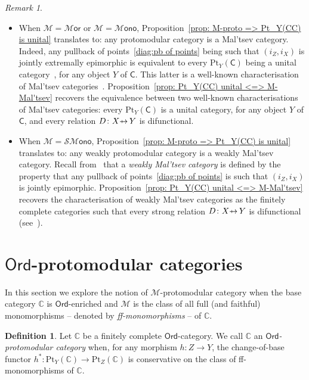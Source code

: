\documentclass[11pt]{amsart}
\theoremstyle{plain}
\theoremstyle{definition}
\newtheorem{definition}[subsection]{Definition}
\theoremstyle{remark}
\newtheorem{remark}[subsection]{Remark}
\newcommand{\defn}[1]{\emph{#1}}
\newcommand{\C}{\ensuremath{\mathsf{C}}}
\newcommand{\CC}{\ensuremath{\mathbb{C}}}
\newcommand{\Ord}{\ensuremath{\mathsf{Ord}}}
\newcommand{\Pt}{\ensuremath{\mathrm{Pt}}}
\newcommand{\M}{\ensuremath{\mathscr{M}}}
\def\relto{{\rightarrow\hspace*{-2.4ex}{\mapstochar}\hspace*{2.2ex}}}
\newcommand{\Mor}{\ensuremath{\mathscr{M}\mathsf{or}}}
\newcommand{\Mono}{\ensuremath{\mathscr{M}\mathsf{ono}}}
\newcommand{\SMono}{\ensuremath{\mathscr{SM}\mathsf{ono}}}
\begin{document}
\begin{remark}\label{rem: proto => Mal'tsev}
\begin{itemize}
	\item[1.] When $\M=\Mor$ or $\M=\Mono$, Proposition~\ref{prop: M-proto => Pt_Y(CC) is unital} translates to: any protomodular category is a Mal'tsev category. Indeed, any pullback of points~\eqref{diag:pb of points} being such that $(i_Z,i_X)$ is jointly extremally epimorphic is equivalent to every $\Pt_Y(\C)$ being a unital category~\cite{MCFPO}, for any object $Y$ of $\C$. This latter is a well-known characterisation of Mal'tsev categories~\cite[Proposition 10]{MCFPO}. Proposition~\ref{prop: Pt_Y(CC) unital <=> M-Mal'tsev} recovers the equivalence between two well-known characterisations of Mal'tsev categories: every $\Pt_Y(\C)$ is a unital category, for any object $Y$ of $\C$, and every relation $D\colon X\relto Y$ is difunctional.
	\item[2.] When $\M=\SMono$, Proposition~\ref{prop: M-proto => Pt_Y(CC) is unital} translates to: any weakly protomodular category is a weakly Mal'tsev category. Recall  from~\cite{NMFweakly} that a \emph{weakly Mal'tsev category} is defined by the property that any pullback of points~\eqref{diag:pb of points} is such that $(i_Z,i_X)$ is jointly epimorphic. Proposition~\ref{prop: Pt_Y(CC) unital <=> M-Mal'tsev} recovers the characterisation of weakly Mal'tsev categories as the finitely complete categories such that every strong relation $D\colon X\relto Y$ is difunctional (see~\cite{JMF}).
\end{itemize}
\end{remark}


\section{$\Ord$-protomodular categories}\label{sect:Ordproto}
In this section we explore the notion of $\M$-protomodular category when the base category $\CC$ is $\Ord$-enriched and $\M$ is the class of all full (and faithful) monomorphisms -- denoted by \defn{ff-monomorphisms} -- of $\CC$.

\begin{definition}\label{def: Ord-proto}
Let $\CC$ be a finitely complete $\Ord$-category. We call $\CC$ an \defn{$\Ord$-protomodular category} when, for any morphism $h\colon Z\to Y$, the change-of-base functor $h^*\colon \Pt_Y(\CC)\to \Pt_Z(\CC)$ is conservative on the class of ff-monomorphisms of $\CC$.
\end{definition}
\end{document}
